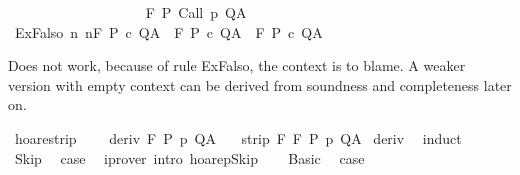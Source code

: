 \begin{isabellebody}
\ \ \ \ \ \ \ \ \ {\isasymLongrightarrow}\ \isanewline
\ \ \ \ \ \ \ \ \ {\isasymGamma}{\isacharcomma}{\isasymTheta}{\isasymturnstile}\isactrlbsub {\isacharslash}F\isactrlesub \ P\ {\isacharparenleft}Call\ p{\isacharparenright}\ Q{\isacharcomma}A{\isachardoublequoteclose}\isanewline
\isanewline
\isanewline
{\isacharbar}\ ExFalso{\isacharcolon}\ {\isachardoublequoteopen}{\isasymlbrakk}{\isasymforall}n{\isachardot}\ {\isasymGamma}{\isacharcomma}{\isasymTheta}{\isasymTurnstile}n{\isacharcolon}\isactrlbsub {\isacharslash}F\isactrlesub \ P\ c\ Q{\isacharcomma}A{\isacharsemicolon}\ {\isasymnot}\ {\isasymGamma}{\isasymTurnstile}\isactrlbsub {\isacharslash}F\isactrlesub \ P\ c\ Q{\isacharcomma}A{\isasymrbrakk}\ {\isasymLongrightarrow}\ {\isasymGamma}{\isacharcomma}{\isasymTheta}{\isasymturnstile}\isactrlbsub {\isacharslash}F\isactrlesub \ P\ c\ Q{\isacharcomma}A{\isachardoublequoteclose}\isanewline
\ \ %
%
\begin{isamarkuptext}%
Does not work, because of rule ExFalso, the context \isa{{\isasymTheta}} is to blame.
 A weaker version with empty context can be derived from soundness 
 and completeness later on.%
\end{isamarkuptext}\isamarkuptrue%
\isamarkupfalse%
\ hoare{\isacharunderscore}strip{\isacharunderscore}{\isasymGamma}{\isacharcolon}\ \isanewline
\ \ \ deriv{\isacharcolon}\ {\isachardoublequoteopen}{\isasymGamma}{\isacharcomma}{\isasymTheta}{\isasymturnstile}\isactrlbsub {\isacharslash}F\isactrlesub \ P\ p\ Q{\isacharcomma}A{\isachardoublequoteclose}\isanewline
\ \ \ {\isachardoublequoteopen}strip\ {\isacharparenleft}{\isacharminus}F{\isacharparenright}\ {\isasymGamma}{\isacharcomma}{\isasymTheta}{\isasymturnstile}\isactrlbsub {\isacharslash}F\isactrlesub \ P\ p\ Q{\isacharcomma}A{\isachardoublequoteclose}\isanewline
%
\isadelimproof
%
\endisadelimproof
%
\isatagproof
{}\isamarkupfalse%
\ deriv\ \isanewline
{}\isamarkupfalse%
\ induct\isanewline
\ \ \isamarkupfalse%
\ Skip\ \isamarkupfalse%
\ {\isacharquery}case\ \isamarkupfalse%
\ {\isacharparenleft}iprover\ intro{\isacharcolon}\ hoarep{\isachardot}Skip{\isacharparenright}\isanewline
{}\isamarkupfalse%
\isanewline
\ \ \isamarkupfalse%
\ Basic\ \isamarkupfalse%
\ {\isacharquery}case\ \isamarkupfalse%

\end{isabellebody}
